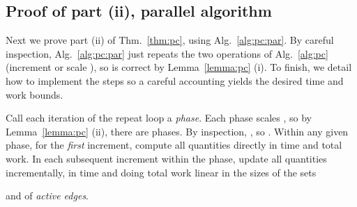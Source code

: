 \begin{algorithm}[t]
\begin{algorithmic}[1]
{\begin{tabular}[t]{@{}lr@{\,~}l@{~~~~~}l@{~\,}r@{\,~}l}
\begin{algorithm}[t]
  \caption{Sequential implementation 
    of Alg.~\ref{alg:pc}\label{alg:pc:imp}
    for mixed packing/covering \LPs}
  \begin{algorithmic}[1]
    \Function{Sequential-Packing-Covering}{}
    \State Initialize  for ,
    ,
    and .
    \State\label{pc:imp:estimate1} 
    Maintain vectors , , , and , to satisfy invariant
    \vspace*{-1.5ex}
    0pt]
          \est C_i &\in& (C_i \,x - 1, C_i\, x]
          &
          \est c_i &=& {(1-\eps)}^{\est C_i} \text{ if } \est C_i \le U, \text{ else } \est c_i=0.
        \end{array}
      \end{array}
      \vspace*{-0.39in}
    3pt]
    \end{tabular}
    \State For , 
    let  (and, implicitly,  for ),
    \State~~choosing  
    such that .
    \State For , let .
    \State For , update  and .
    For , update  and .
    \State\label{pc:par:update}
    For , update ,  , and .
    \State If  then {\bf return} . 
    \EndBlock
    \EndWhile 
    \label{op:bp}
    \State Let .
    \EndBlock
    \EndRepeat
    \EndFunction 
  \end{algorithmic}
\end{algorithm}

\subsection{Proof of part (ii), parallel algorithm}
Next we prove part (ii) of Thm.~\ref{thm:pc}, using Alg.~\ref{alg:pc:par}.
By careful inspection, Alg.~\ref{alg:pc:par}
just repeats the two operations of Alg.~\ref{alg:pc}
(increment  or scale ),
so is correct by Lemma~\ref{lemma:pc} (i).
To finish, we detail how to implement the steps
so a careful accounting yields the desired time and work bounds.

Call each iteration of the repeat loop a {\em phase}.
Each phase scales , so by Lemma~\ref{lemma:pc} (ii), there are  phases.
By inspection, , so .  
Within any given phase, 
for the \emph{first} increment,
compute all quantities directly
in  time and  total work.
In each subsequent increment within the phase,
update all quantities incrementally,
in time  and doing total work
linear in the sizes of the sets

and 
of \emph{active edges}.

